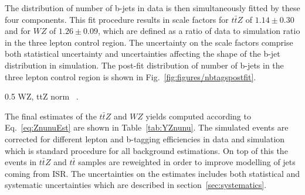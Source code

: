 The distribution of number of b-jets in data is then simultaneously fitted by these four components. This fit procedure results in scale factors for $t\bar{t}Z$ of $1.14 \pm 0.30$ and for $WZ$ of $1.26 \pm 0.09$, which are defined as a ratio of data to simulation ratio in the three lepton control region. The uncertainty on the scale factors comprise both statistical uncertainty and uncertainties affecting the shape of the b-jet distribution in simulation. The post-fit distribution of number of b-jets in the three lepton control region is shown in Fig.~\ref{fig:figures/nbtagspostfit}.

                 {0.5}       %
                 { WZ, ttZ norm ~\cite{Sirunyan:2017uyt}. }


The final estimates of the $t\bar{t}Z$ and $WZ$ yields computed according to Eq.~\ref{eq:ZnunuEst} are shown in Table~\ref{tab:YZnunu}. The simulated events are corrected for different lepton and b-tagging efficiencies in data and simulation which is standard procedure for all background estimations. On top of this the events in $t\bar{t}Z$ and $t\bar{t}$ samples are reweighted in order to improve modelling of jets coming from ISR. The uncertainties on the estimates includes both statistical and systematic uncertainties which are described in section~\ref{sec:systematics}.


